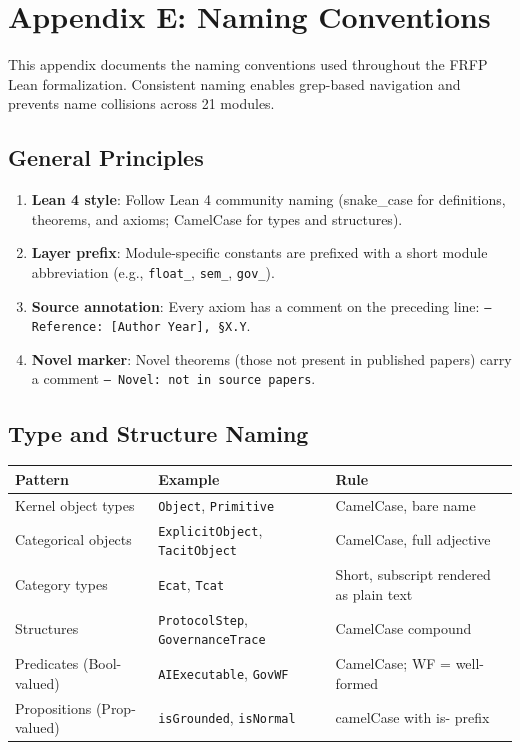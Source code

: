 \section{Appendix E: Naming Conventions}
\label{app:naming}

This appendix documents the naming conventions used throughout the FRFP Lean
formalization. Consistent naming enables grep-based navigation and prevents
name collisions across 21 modules.

\subsection*{General Principles}

\begin{enumerate}
  \item \textbf{Lean 4 style}: Follow Lean 4 community naming (snake\_case for
        definitions, theorems, and axioms; CamelCase for types and structures).
  \item \textbf{Layer prefix}: Module-specific constants are prefixed with
        a short module abbreviation (e.g., \texttt{float\_}, \texttt{sem\_},
        \texttt{gov\_}).
  \item \textbf{Source annotation}: Every axiom has a comment on the preceding
        line: \texttt{-- Reference: [Author Year], §X.Y}.
  \item \textbf{Novel marker}: Novel theorems (those not present in published
        papers) carry a comment \texttt{-- Novel: not in source papers}.
\end{enumerate}

\subsection*{Type and Structure Naming}

\begin{center}
\begin{tabular}{lll}
\toprule
Pattern & Example & Rule \\
\midrule
Kernel object types & \texttt{Object}, \texttt{Primitive} & CamelCase, bare name \\
Categorical objects & \texttt{ExplicitObject}, \texttt{TacitObject} & CamelCase, full adjective \\
Category types & \texttt{Ecat}, \texttt{Tcat} & Short, subscript rendered as plain text \\
Structures & \texttt{ProtocolStep}, \texttt{GovernanceTrace} & CamelCase compound \\
Predicates (Bool-valued) & \texttt{AIExecutable}, \texttt{GovWF} & CamelCase; WF = well-formed \\
Propositions (Prop-valued) & \texttt{isGrounded}, \texttt{isNormal} & camelCase with is- prefix \\
\bottomrule
\end{tabular}
\end{center}

